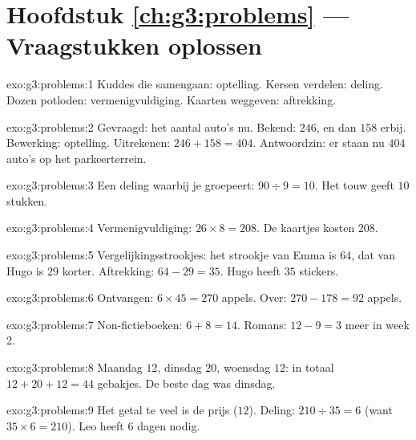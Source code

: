\section*{Hoofdstuk \ref{ch:g3:problems} --- Vraagstukken oplossen}

\begin{solution}{exo:g3:problems:1}
Kuddes die samengaan: optelling. Kersen verdelen: deling. Dozen potloden:
vermenigvuldiging. Kaarten weggeven: aftrekking.
\end{solution}

\begin{solution}{exo:g3:problems:2}
Gevraagd: het aantal auto's nu. Bekend: $246$, en dan $158$ erbij.
Bewerking: optelling. Uitrekenen: $246 + 158 = 404$. Antwoordzin: er staan
nu $404$ auto's op het parkeerterrein.
\end{solution}

\begin{solution}{exo:g3:problems:3}
Een deling waarbij je groepeert: $90 \div 9 = 10$. Het touw geeft $10$
stukken.
\end{solution}

\begin{solution}{exo:g3:problems:4}
Vermenigvuldiging: $26 \times 8 = 208$. De kaartjes kosten $208$.
\end{solution}

\begin{solution}{exo:g3:problems:5}
Vergelijkingsstrookjes: het strookje van Emma is $64$, dat van Hugo is
$29$ korter. Aftrekking: $64 - 29 = 35$. Hugo heeft $35$ stickers.
\end{solution}

\begin{solution}{exo:g3:problems:6}
Ontvangen: $6 \times 45 = 270$ appels. Over: $270 - 178 = 92$ appels.
\end{solution}

\begin{solution}{exo:g3:problems:7}
Non-fictieboeken: $6 + 8 = 14$. Romans: $12 - 9 = 3$ meer in week 2.
\end{solution}

\begin{solution}{exo:g3:problems:8}
Maandag $12$, dinsdag $20$, woensdag $12$: in totaal
$12 + 20 + 12 = 44$ gebakjes. De beste dag was dinsdag.
\end{solution}

\begin{solution}{exo:g3:problems:9}
Het getal te veel is de prijs ($12$). Deling: $210 \div 35 = 6$ (want
$35 \times 6 = 210$). Leo heeft $6$ dagen nodig.
\end{solution}

